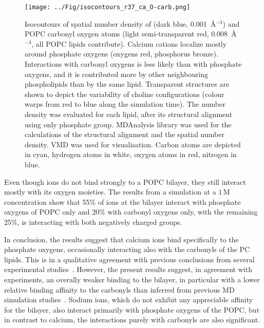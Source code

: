 \documentclass[journal=jpcbfk,manuscript=article]{achemso}
\begin{document}
\begin{figure}[tb!]
  \centering
  \texttt{[image: ../Fig/isocontours\_r37\_ca\_O-carb.png]} %
  \caption{\label{fig:volmaps}
    Isocontours of spatial number density of  (dark blue, 0.001~\AA$^{-3}$) 
    and POPC carbonyl oxygen atoms (light semi-transparent red, 0.008~\AA$^{-3}$, all POPC lipids contribute). 
    Calcium cations localize mostly around phosphate oxygens (oxygens red, phosphorus bronze).
    Interactions with carbonyl oxygens is less likely than with phosphate oxygens, 
    and it is contributed more by other neighbouring phospholipids than by the same lipid. 
    Transparent structures are shown to depict the variability of choline configurations 
    (colour warps from red to blue along the simulation time). 
    The number density was evaluated for each lipid, 
    after its structural alignment using only phosphate group.
    MDAnalysis \cite{mdanalysis2011} library was used for 
    the calculations of the structural alignment and the spatial number density. 
    VMD \cite{hump96} was used for visualisation. 
    Carbon atoms are depicted in cyan, hydrogen atoms in white, oxygen atoms in red, nitrogen in blue.
  }
\end{figure}

Even though  ions do not bind strongly to a POPC bilayer, they still interact mostly with its oxygen moieties. The results from a simulation at a $1\,$M  concentration show that 55\% of  ions at the bilayer interact with phosphate oxygens of POPC only and 20\% with carbonyl oxygens only, with the remaining 25\%, is interacting with both negatively charged groups.

In conclusion, the results suggest that calcium ions bind specifically to the phosphate oxygens, occasionally interacting also with the carbonyls of the PC lipids. This is in a qualitative agreement with previous conclusions from several experimental studies~\cite{hauser76, hauser78, herbette84, cevc90, binder02}. However, the present results suggest, in
agreement with experiments, an overally weaker binding to the bilayer, in particular with a lower relative binding affinity to the carbonyls than inferred from previous MD simulation studies~\cite{bockmann03, bockmann04, melcrova16, javanainen17}. Sodium ions, which do not exhibit any appreciable affinity for the bilayer, also interact primarily with phosphate oxygens of the POPC, but in contrast to calcium, the interactions purely with carbonyls are also significant.
\end{document}
